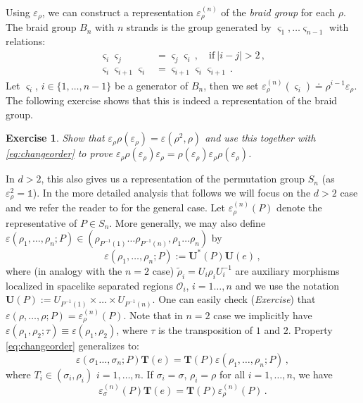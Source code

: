 \documentclass[12pt]{article}
\newcommand{\1}{\mathds{1}}                         %
\newcommand{\Ocal}{\mathcal{O}}
\newcommand{\Ac}{{\mathcal{A}}}
\newtheorem{exercise}[theorem]{Exercise}
\begin{document}
Using $\varepsilon_\rho$, we can construct a representation $\varepsilon^{(n)}_\rho$ of the \emph{braid group} for each $\rho$. The braid group $B_n$ with $n$ strands is the group generated by $\varsigma_1,\dots \varsigma_{n-1}$ with relations:
\begin{align*}
\varsigma_i\varsigma_j&=\varsigma_j\varsigma_i\,,\quad \textrm{if}\ |i-j|>2\,,\\
\varsigma_i \varsigma_{i+1} \varsigma_i&=\varsigma_{i+1}\varsigma_i \varsigma_{i+1}\,.
 \end{align*}
Let $\varsigma_i$, $i\in\{1,\dots,n-1\}$ be a generator of  $B_n$, then we set $\varepsilon^{(n)}_\rho(\varsigma_i)\doteq \rho^{i-1}\varepsilon_\rho$. 
The following exercise shows that this is indeed a representation of the braid group.
\begin{exercise}
   Show that $\varepsilon_\rho\rho(\varepsilon_\rho)=\varepsilon(\rho^2,\rho)$ and use this together with \eqref{eq:changeorder} to prove $\varepsilon_\rho\rho(\varepsilon_\rho)\varepsilon_\rho=\rho(\varepsilon_\rho)\varepsilon_\rho\rho(\varepsilon_\rho)$.
\end{exercise}

In $d>2$, this also gives us a representation of the permutation group $S_n$ (as $\varepsilon_\rho^2=\1$). In the more detailed analysis that follows we will focus on the $d>2$ case and we refer the reader to \cite{FRS89} for the general case. Let  $\varepsilon^{(n)}_\rho(P)$ denote the representative of $P\in S_n$. More generally, we may also define $\varepsilon(\rho_1,\dots,\rho_n; P)\in (\rho_{P^{-1}(1)}\dots \rho_{P^{-1}(n)},\rho_1\dots\rho_n)$ by
\[
\varepsilon(\rho_1,\dots,\rho_n;P):=\boldsymbol{U}^*(P)  \boldsymbol{U}(e)\,,
\]
where (in analogy with the $n=2$ case) $\tilde{\rho}_i=U_i\rho_i U_i^{-1}$ are auxiliary morphisms localized in spacelike separated regions $\Ocal_i$, $i=1\dots,n$ and we use the notation $\boldsymbol{U}(P):=U_{P^{-1}(1)}\times\dots \times U_{P^{-1}(n)}$. One can easily check (\textit{Exercise}) that $\varepsilon(\rho,\dots,\rho;P)=\varepsilon^{(n)}_\rho(P)$. Note that in $n=2$ case we implicitly have $\varepsilon(\rho_1,\rho_2;\tau)\equiv \varepsilon(\rho_1,\rho_2)$, where $\tau$ is the transposition of $1$ and $2$.
Property \eqref{eq:changeorder} generalizes to:
\[
\varepsilon(\sigma_1\dots,\sigma_n;P)   \boldsymbol{T}(e)=\boldsymbol{T}(P)  \varepsilon(\rho_1,\dots,\rho_n;P)\,,
\]
where $T_i\in(\sigma_i,\rho_i)$  $i=1,\dots,n$. If $\sigma_i=\sigma$, $\rho_i=\rho$ for all $i=1,\dots,n$, we have
\[
\varepsilon^{(n)}_\sigma(P)   \boldsymbol{T}(e)=\boldsymbol{T}(P)  \varepsilon^{(n)}_\rho(P)\,.
\]
\end{document}
